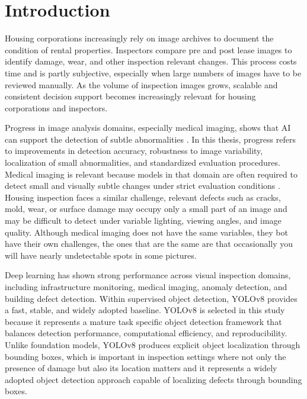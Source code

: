 \section{Introduction}
\label{sec:introduction}

Housing corporations increasingly rely on image archives to document the condition of rental properties\cite{kang_improvement_2025,wen_autonomous_2024}. Inspectors compare pre and post lease images to identify damage, wear, and other inspection relevant changes. This process costs time and is partly subjective, especially when large numbers of images have to be reviewed manually. As the volume of inspection images grows, scalable and consistent decision support becomes increasingly relevant for housing corporations and inspectors.

Progress in image analysis domains, especially medical imaging, shows that AI can support the detection of subtle abnormalities \cite{kamraoui_longitudinal_2022,litjens_deep_2017,esteva_dermatologist_2017}. In this thesis, progress refers to improvements in detection accuracy, robustness to image variability, localization of small abnormalities, and standardized evaluation procedures. Medical imaging is relevant because models in that domain are often required to detect small and visually subtle changes under strict evaluation conditions \cite{kamraoui_longitudinal_2022,rana_yolo_2025,litjens_deep_2017}. Housing inspection faces a similar challenge, relevant defects such as cracks, mold, wear, or surface damage may occupy only a small part of an image and may be difficult to detect under variable lighting, viewing angles, and image quality. Although medical imaging does not have the same variables, they bot have their own challenges, the ones that are the same are that occasionally you will have nearly undetectable spots in some pictures.

Deep learning has shown strong performance across visual inspection domains, including infrastructure monitoring, medical imaging, anomaly detection, and building defect detection\cite{kang_improvement_2025,cheng_change_2024,lee_automated_2024,shang_automatic_2023,litjens_deep_2017}. Within supervised object detection, YOLOv8 provides a fast, stable, and widely adopted baseline. \cite{jocher_ultralytics_2023,redmon_you_2016} YOLOv8 is selected in this study because it represents a mature task specific object detection framework that balances detection performance, computational efficiency, and reproducibility. Unlike foundation models, YOLOv8 produces explicit object localization through bounding boxes, which is important in inspection settings where not only the presence of damage but also its location matters and it represents a widely adopted object detection approach capable of localizing defects through bounding boxes.

